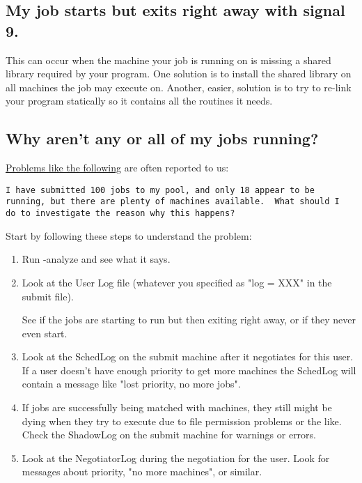 \subsection*{My job starts but exits right away with signal 9.}


This can occur when the machine your job is running on is missing a
shared library required by your program.
One solution is to install the shared library on all machines the job
may execute on.
Another, easier, solution is to try to re-link your program statically
so it contains all the routines it needs.


\subsection*{Why aren't any or all of my jobs running?}

\underline{Problems like the following} are often reported to us:

\begin{verbatim}
I have submitted 100 jobs to my pool, and only 18 appear to be
running, but there are plenty of machines available.  What should I
do to investigate the reason why this happens?
\end{verbatim}

Start by following these steps to understand the problem:

\begin{enumerate}

\item Run  -analyze and see what it says.

\item Look at the User Log file (whatever you specified as "log = XXX"
in the submit file).

See if the jobs are starting to run but then exiting right away, or if
they never even start.

\item Look at the SchedLog on the submit machine after it negotiates
for this user.
If a user doesn't have enough priority to get more machines the
SchedLog will contain a message like "lost priority, no more jobs".

\item If jobs are successfully being matched with machines, they
still might be dying when they try to execute due to file permission
problems or the like.
Check the ShadowLog on the submit machine for warnings or errors.

\item Look at the NegotiatorLog during the negotiation for the user.
Look for messages about priority, "no more machines", or similar.

\end{enumerate}

